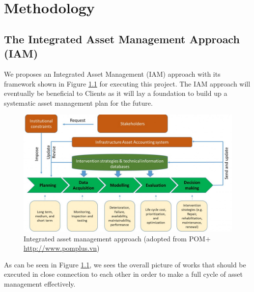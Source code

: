 \chapter{Methodology} %
\label{Chapter3}

\section{The Integrated Asset Management Approach (IAM)}
\label{31}
We proposes an Integrated Asset Management (IAM) approach with its framework shown in Figure \ref{iam_pomplus} for executing this project. The IAM approach will eventually be beneficial to Clients as it will lay a foundation to build up a systematic asset management plan for the future. %

\begin{figure}[!htb]
	\includegraphics[scale=0.3]{figures/iam_pomplus} 
	\caption{Integrated asset management approach (adopted from POM+  \href{http://www.pomplus.vn}{http://www.pomplus.vn})}

	\label{iam_pomplus}
\end{figure}

As can be seen in Figure \ref{iam_pomplus}, we sees the overall picture of works that should be executed in close connection to each other in order to make a full cycle of asset management effectively. 

